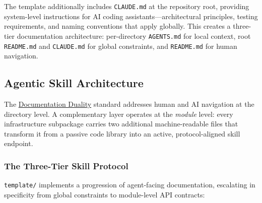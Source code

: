 \documentclass[
]{article}
\begin{document}
The template additionally includes \texttt{CLAUDE.md} at the repository
root, providing system-level instructions for AI coding
assistants---architectural principles, testing requirements, and naming
conventions that apply globally. This creates a three-tier documentation
architecture: per-directory \texttt{AGENTS.md} for local context, root
\texttt{README.md} and \texttt{CLAUDE.md} for global constraints, and
\texttt{README.md} for human navigation.

\subsection{Agentic Skill
Architecture}\label{agentic-skill-architecture}

The \hyperref[documentation-duality-and-ai-collaboration]{Documentation
Duality} standard addresses human and AI navigation at the directory
level. A complementary layer operates at the \emph{module} level: every
infrastructure subpackage carries two additional machine-readable files
that transform it from a passive code library into an active,
protocol-aligned skill endpoint.

\subsubsection{The Three-Tier Skill
Protocol}\label{the-three-tier-skill-protocol}

\texttt{template/} implements a progression of agent-facing
documentation, escalating in specificity from global constraints to
module-level API contracts:
\end{document}
